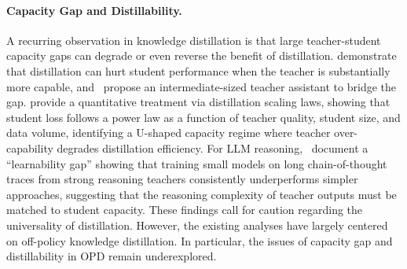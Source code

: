 \paragraph{Capacity Gap and Distillability.}
A recurring observation in knowledge distillation is that large teacher-student capacity gaps can degrade or even reverse the benefit of distillation.
\citet{cho2019efficacy} demonstrate that distillation can hurt student performance when the teacher is substantially more capable, and~\citet{mirzadeh2020improved} propose an intermediate-sized teacher assistant to bridge the gap.
\citet{busbridge2025distillation} provide a quantitative treatment via distillation scaling laws, showing that student loss follows a power law as a function of teacher quality, student size, and data volume, identifying a U-shaped capacity regime where teacher over-capability degrades distillation efficiency.
For LLM reasoning,~\citet{li2025small} document a ``learnability gap'' showing that training small models on long chain-of-thought traces from strong reasoning teachers consistently underperforms simpler approaches, suggesting that the reasoning complexity of teacher outputs must be matched to student capacity.
These findings call for caution regarding the universality of distillation. However, the existing analyses have largely centered on off-policy knowledge distillation. In particular, the issues of capacity gap and distillability in OPD remain underexplored.











